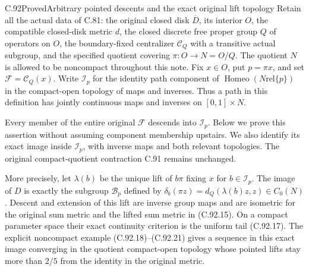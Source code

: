 \begin{claim}{C.92}{Proved}{Arbitrary pointed descents and the exact original lift topology}
Retain all the actual data of C.81: the original closed disk
$\overline D$, its interior $O$, the compatible closed-disk metric $d$,
the closed discrete free proper group $Q$ of operators on $O$,
the boundary-fixed centralizer $\mathscr C_Q$ with a transitive actual
subgroup, and the specified quotient covering $\pi:O\to N=O/Q$.
The quotient $N$ is allowed to be noncompact throughout this note.
Fix $x\in O$, put $p=\pi x$, and set $\mathscr F=\mathscr C_Q(x)$.
Write $\mathscr I_p$ for the identity path component of
$\operatorname{Homeo}(N\mathbin{\mathrm{rel}}\{p\})$ in the compact-open
topology of maps and inverses. Thus a path in this definition has
jointly continuous maps and inverses on $[0,1]\times N$.

Every member of the entire original $\mathscr F$ descends into
$\mathscr I_p$. Below we prove this assertion without assuming
component membership upstairs. We also identify its exact image
inside $\mathscr I_p$, with inverse maps and both relevant topologies.
The original compact-quotient contraction C.91 remains unchanged.


More precisely, let $\lambda(b)$ be the unique lift of $b\pi$
fixing $x$ for $b\in\mathscr I_p$. The image of $D$ is exactly
the subgroup $\mathscr B_p$ defined by
$\delta_b(\pi z)=d_Q(\lambda(b)z,z)\in C_0(N)$.
Descent and extension of this lift are inverse group maps and
are isometric for the original sum metric and the lifted sum
metric in (C.92.15). On a compact parameter space their exact
continuity criterion is the uniform tail (C.92.17).
The explicit noncompact example (C.92.18)--(C.92.21) gives a
sequence in this exact image converging in the quotient
compact-open topology whose pointed lifts stay more than
$2/5$ from the identity in the original metric.

\end{claim}

